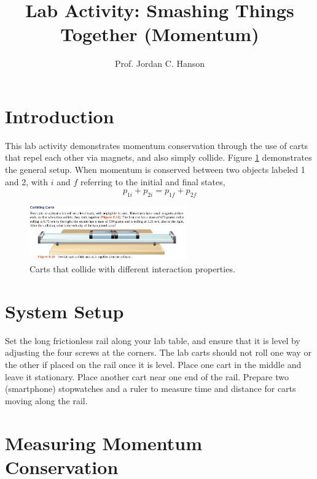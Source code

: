 \documentclass{article}
\begin{document}
\title{Lab Activity: Smashing Things Together (Momentum)}
\author{Prof. Jordan C. Hanson}

\maketitle

\section{Introduction}
This lab activity demonstrates momentum conservation through the use of carts that repel each other via magnets, and also simply collide.  Figure \ref{fig:carts} demonstrates the general setup. When momentum is conserved between two objects labeled 1 and 2, with $i$ and $f$ referring to the initial and final states,
\begin{equation}
p_{1i} + p_{2i} = p_{1f} + p_{2f}
\end{equation}

\begin{figure}[ht]
\centering
\includegraphics[width=0.6\textwidth,trim=0cm 1.2cm 0cm 5cm,clip=true]{figures/carts.png}
\caption{\label{fig:carts} Carts that collide with different interaction properties.}
\end{figure}

\section{System Setup}

Set the long frictionless rail along your lab table, and ensure that it is level by adjusting the four screws at the corners.  The lab carts should not roll one way or the other if placed on the rail once it is level.  Place one cart in the middle and leave it stationary.  Place another cart near one end of the rail.  Prepare two (smartphone) stopwatches and a ruler to measure time and distance for carts moving along the rail.

\section{Measuring Momentum Conservation}
\end{document}
